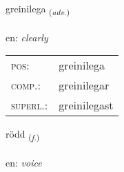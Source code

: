\documentclass[frontgrid, backgrid]{flacards}\usepackage[]{graphicx}\usepackage[]{color}
\begin{document}
\renewcommand{\flhead}{\vskip5pt \fboxsep=0pt {\small\bfseries\footnotesize Atviksorð | Adverb}}
\renewcommand{\fcfoot}{\vskip5pt \fboxsep=0pt \hspace{2pt}{\small\bfseries\footnotesize 2K}}

\renewcommand{\blhead}{\vskip5pt {\small\bfseries\footnotesize Atviksorð | Adverb }}
\renewcommand{\bcfoot}{\vskip5pt \hspace{2pt}{\small\bfseries\footnotesize 2K}}


{greinilega \small{\textsubscript{(\textit{adv.})}} \\[1ex] %
\textphonetic{[kreiːnɪlɛɣa]} \\
en: \emph{clearly} \\  [2ex]
\renewcommand*{\arraystretch}{0.8}
\begin{tabular}{ll}
\textsc{pos}: & greinilega \\ 
\textsc{comp.}: & greinilegar \\ 
\textsc{superl.}: & greinilegast \\
\end{tabular}
}

\renewcommand{\flhead}{\vskip5pt \fboxsep=0pt {\small\bfseries\footnotesize Nafnorð | Noun}}
\renewcommand{\fcfoot}{\vskip5pt \fboxsep=0pt \hspace{2pt}{\small\bfseries\footnotesize 2K}}

\renewcommand{\blhead}{\vskip5pt {\small\bfseries\footnotesize Nafnorð | Noun }}
\renewcommand{\bcfoot}{\vskip5pt \hspace{2pt}{\small\bfseries\footnotesize 2K}}


{rödd \small{\textsubscript{(\textit{f.})}} \\[1ex] %
\textphonetic{[rœt]} \\
en: \emph{voice} \\  [2ex]
\renewcommand*{\arraystretch}{0.8}
}
\end{document}
